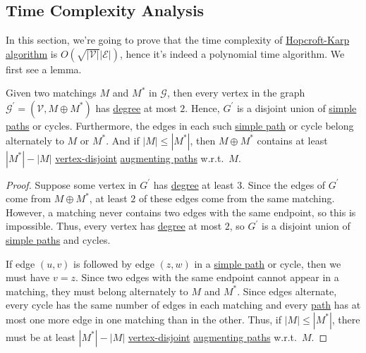 \subsection{Time Complexity Analysis}
In this section, we're going to prove that the time complexity of \hyperref[algo:Hopcroft-Karp-algorithm]{Hopcroft-Karp algorithm} is \(O(\sqrt{\left\vert \mathcal{V}  \right\vert } \left\vert \mathcal{E}  \right\vert )\), hence it's indeed a polynomial time algorithm. We first see a lemma.

\begin{lemma}\label{lma:lec25-2}
	Given two matchings \(M\) and \(M^{\ast} \) in \(\mathcal{G} \), then every vertex in the graph \(\mathcal{G} ^\prime =(\mathcal{V} , M\oplus M^{\ast} )\) has \hyperref[def:degree]{degree} at most \(2\). Hence, \(G^\prime \) is a disjoint union of \hyperref[def:simple-path]{simple paths} or cycles. Furthermore, the edges in each such \hyperref[def:simple-path]{simple path} or cycle belong alternately to \(M\) or \(M^{\ast} \). And if \(\left\vert M \right\vert \leq \left\vert M^{\ast}  \right\vert \), then \(M\oplus M^{\ast} \) contains at least \(\left\vert M^{\ast}  \right\vert - \left\vert M \right\vert \) \hyperref[def:vertex-independent]{vertex-disjoint} \hyperref[def:augmenting-path]{augmenting paths} w.r.t.\ \(M\).
\end{lemma}
\begin{proof}
	Suppose some vertex in \(G^\prime \) has \hyperref[def:degree]{degree} at least \(3\). Since the edges of \(G^\prime \) come from \(M\oplus M^{\ast} \), at least \(2\) of these edges come from the same matching. However, a matching never contains two edges with the same endpoint, so this is impossible. Thus, every vertex has \hyperref[def:degree]{degree} at most \(2\), so \(G^\prime \) is a disjoint union of \hyperref[def:simple-path]{simple paths} and cycles.

	If edge \((u, v)\) is followed by edge \((z, w)\) in a \hyperref[def:simple-path]{simple path} or cycle, then we must have \(v=z\). Since two edges with the same endpoint cannot appear in a matching, they must belong alternately to \(M\) and \(M^{\ast} \). Since edges alternate, every cycle has the same number of edges in each matching and every \hyperref[def:path]{path} has at most one more edge in one matching than in the other. Thus, if \(\left\vert M \right\vert \leq \left\vert M^{\ast}  \right\vert \), there must be at least \(\left\vert M^{\ast} \right\vert - \left\vert M \right\vert \) \hyperref[def:vertex-independent]{vertex-disjoint} \hyperref[def:augmenting-path]{augmenting paths} w.r.t.\ \(M\).
\end{proof}

